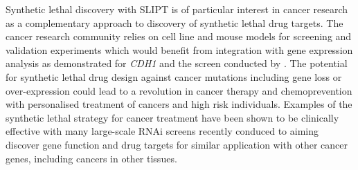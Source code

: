 Synthetic lethal discovery with \gls{SLIPT} is of particular interest in cancer research as a complementary approach to discovery of \gls{synthetic lethal} drug targets. The cancer research community relies on cell line and mouse models for screening and validation experiments \citep{Fece2015} which would benefit from integration with \gls{gene expression} analysis as demonstrated for \textit{CDH1} and the screen conducted by \citet{Telford2015}. The potential for \gls{synthetic lethal} drug design against cancer \glspl{mutation} including gene loss or over-expression could lead to a revolution in cancer therapy and \gls{chemoprevention} with personalised \gls{treatment} of cancers and high risk individuals.  Examples of the \gls{synthetic lethal} strategy \citep{Farmer2005, Bryant2005} for cancer \gls{treatment} have been shown to be clinically effective with many large-scale \gls{RNAi} screens recently conduced to aiming discover gene function and drug targets for similar application with other cancer genes, including cancers in other tissues.




